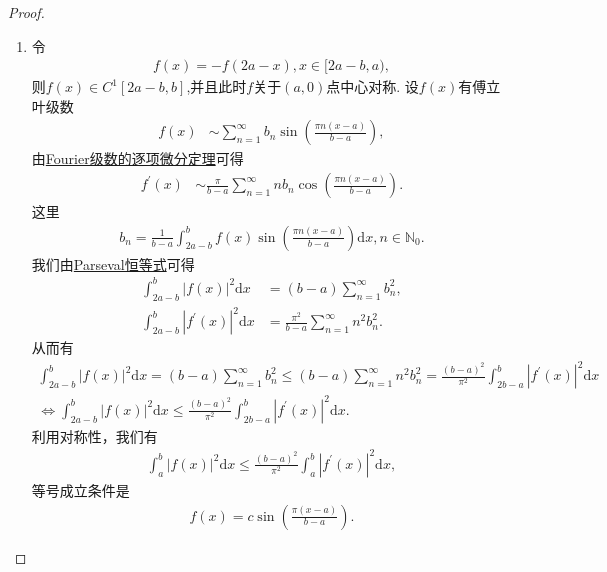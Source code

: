 \documentclass[../../main.tex]{subfiles}%
\begin{document}
\begin{proof}
\begin{enumerate}[(1)]
\item 令
\begin{align*}
f(x)=-f(2a - x), x\in[2a - b,a),
\end{align*}
则$f(x)\in C^1[2a - b,b]$,并且此时$f$关于$(a,0)$点中心对称.
设$f(x)$有傅立叶级数
\begin{align*}
f(x) &\sim \sum_{n = 1}^{\infty}b_n\sin\left(\frac{\pi n(x - a)}{b - a}\right),
\end{align*}
由\hyperref[theorem:Fourier级数的逐项微分定理]{Fourier级数的逐项微分定理}可得
\begin{align*}
f^{\prime}(x) &\sim \frac{\pi}{b - a}\sum_{n = 1}^{\infty}nb_n\cos\left(\frac{\pi n(x - a)}{b - a}\right).
\end{align*}
这里
\begin{align*}
b_n=\frac{1}{b - a}\int_{2a - b}^{b}f(x)\sin\left(\frac{\pi n(x - a)}{b - a}\right)\mathrm{d}x, n\in\mathbb{N}_0.
\end{align*}
我们由\hyperref[theorem:Parseval恒等式]{Parseval恒等式}可得
\begin{align*}
\int_{2a - b}^{b}|f(x)|^2\mathrm{d}x&=(b - a)\sum_{n = 1}^{\infty}b_n^2,\\
\int_{2a - b}^{b}|f^{\prime}(x)|^2\mathrm{d}x&=\frac{\pi^2}{b - a}\sum_{n = 1}^{\infty}n^2b_n^2.
\end{align*}
从而有
\begin{gather*}
\int_{2a-b}^b{|f(x)|^2\mathrm{d}x}=\left( b-a \right) \sum_{n=1}^{\infty}{b_{n}^{2}}\leqslant \left( b-a \right) \sum_{n=1}^{\infty}{n^2b_{n}^{2}}=\frac{(b-a)^2}{\pi ^2}\int_{2b-a}^b{|f^{\prime}(x)|^2\mathrm{d}x}
\\
\Longleftrightarrow \int_{2a-b}^b{|f(x)|^2\mathrm{d}x}\leqslant \frac{(b-a)^2}{\pi ^2}\int_{2b-a}^b{|f^{\prime}(x)|^2\mathrm{d}x}.
\end{gather*}
利用对称性，我们有
\begin{align*}
\int_{a}^{b}|f(x)|^2\mathrm{d}x\leqslant \frac{(b - a)^2}{\pi^2}\int_{a}^{b}|f^{\prime}(x)|^2\mathrm{d}x,
\end{align*}
等号成立条件是
\begin{align*}
f(x)=c\sin\left(\frac{\pi(x - a)}{b - a}\right).
\end{align*} 
\end{enumerate}

\end{proof}
\end{document}
